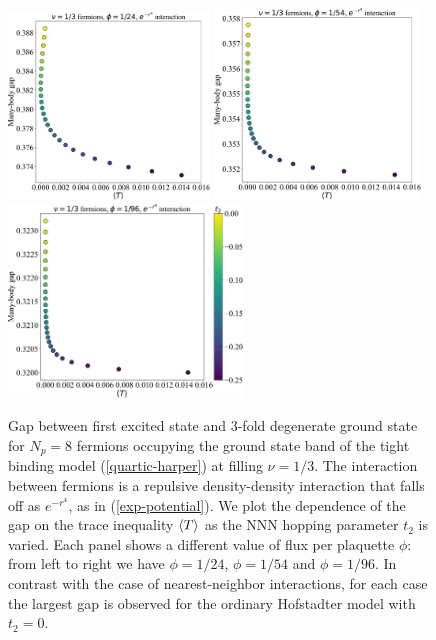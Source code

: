 \documentclass[aps,prb,twocolumn,letterpaper,twoside,nobalancelastpage,groupedaddress,amsmath,amssymb,floatfix,citeautoscript]{revtex4-1}
\begin{document}

\begin{figure}[t]
\includegraphics[width=2.1in]{gap-v-trace-fermions-24-exponential.pdf}
\includegraphics[width=2.15in]{gap-v-trace-fermions-54-exponential.pdf}
\includegraphics[width=2.45in]{gap-v-trace-fermions-96-exponential.pdf}
\caption{\label{gap-v-trace-fermions} Gap between first excited state and 3-fold degenerate ground state for $N_p = 8$ fermions occupying the ground state band of the tight binding model (\ref{quartic-harper}) at filling $\nu=1/3$. The interaction between fermions is a repulsive density-density interaction that falls off as $e^{-r^4}$, as in (\ref{exp-potential}). We plot the dependence of the gap on the trace inequality $\expval{T}$ as the NNN hopping parameter $t_2$ is varied. Each panel shows a different value of flux per plaquette $\phi$: from left to right we have $\phi=1/24$, $\phi=1/54$ and $\phi=1/96$. In contrast with the case of nearest-neighbor interactions, for each case the largest gap is observed for the ordinary Hofstadter model with $t_2 = 0$.}
\end{figure}
\end{document}
